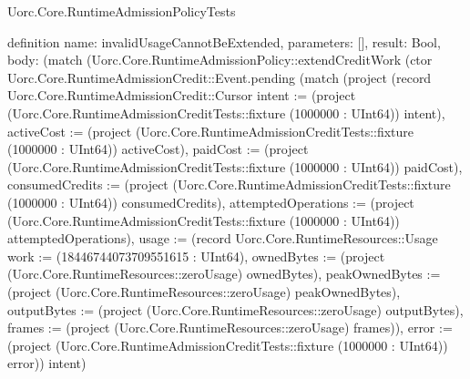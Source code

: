 \begin{lexlean}{Uorc.Core.RuntimeAdmissionPolicyTests}
\begin{semanticmodule}
definition{
  name: invalidUsageCannotBeExtended,
  parameters: [],
  result: Bool,
  body: (match (Uorc.Core.RuntimeAdmissionPolicy::extendCreditWork (ctor Uorc.Core.RuntimeAdmissionCredit::Event.pending (match (project (record Uorc.Core.RuntimeAdmissionCredit::Cursor {intent := (project (Uorc.Core.RuntimeAdmissionCreditTests::fixture (1000000 : UInt64)) intent), activeCost := (project (Uorc.Core.RuntimeAdmissionCreditTests::fixture (1000000 : UInt64)) activeCost), paidCost := (project (Uorc.Core.RuntimeAdmissionCreditTests::fixture (1000000 : UInt64)) paidCost), consumedCredits := (project (Uorc.Core.RuntimeAdmissionCreditTests::fixture (1000000 : UInt64)) consumedCredits), attemptedOperations := (project (Uorc.Core.RuntimeAdmissionCreditTests::fixture (1000000 : UInt64)) attemptedOperations), usage := (record Uorc.Core.RuntimeResources::Usage {work := (18446744073709551615 : UInt64), ownedBytes := (project (Uorc.Core.RuntimeResources::zeroUsage) ownedBytes), peakOwnedBytes := (project (Uorc.Core.RuntimeResources::zeroUsage) peakOwnedBytes), outputBytes := (project (Uorc.Core.RuntimeResources::zeroUsage) outputBytes), frames := (project (Uorc.Core.RuntimeResources::zeroUsage) frames)}), error := (project (Uorc.Core.RuntimeAdmissionCreditTests::fixture (1000000 : UInt64)) error)}) intent)
}
\end{semanticmodule}
\end{lexlean}
